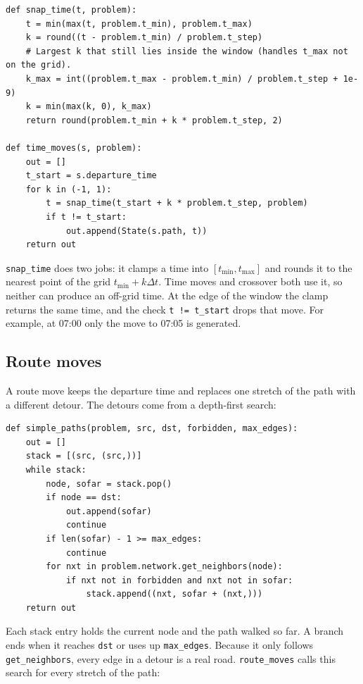 \documentclass[11pt,a4paper]{article}
\newcommand{\col}[1]{\texttt{#1}}
\begin{document}
\begin{lstlisting}
def snap_time(t, problem):
    t = min(max(t, problem.t_min), problem.t_max)
    k = round((t - problem.t_min) / problem.t_step)
    # Largest k that still lies inside the window (handles t_max not on the grid).
    k_max = int((problem.t_max - problem.t_min) / problem.t_step + 1e-9)
    k = min(max(k, 0), k_max)
    return round(problem.t_min + k * problem.t_step, 2)

def time_moves(s, problem):
    out = []
    t_start = s.departure_time
    for k in (-1, 1):
        t = snap_time(t_start + k * problem.t_step, problem)
        if t != t_start:
            out.append(State(s.path, t))
    return out
\end{lstlisting}

\noindent \col{snap\_time} does two jobs: it clamps a time into $[t_{\min}, t_{\max}]$ and rounds it
to the nearest point of the grid $t_{\min} + k\Delta t$. Time moves and crossover both use it, so
neither can produce an off-grid time. At the edge of the window the clamp returns the
same time, and the check \col{t != t\_start} drops that move. For example, at 07:00 only the
move to 07:05 is generated.

\subsection{Route moves}

A route move keeps the departure time and replaces one stretch of the path with a different detour.
The detours come from a depth-first search:

\begin{lstlisting}
def simple_paths(problem, src, dst, forbidden, max_edges):
    out = []
    stack = [(src, (src,))]
    while stack:
        node, sofar = stack.pop()
        if node == dst:
            out.append(sofar)
            continue
        if len(sofar) - 1 >= max_edges:
            continue
        for nxt in problem.network.get_neighbors(node):
            if nxt not in forbidden and nxt not in sofar:
                stack.append((nxt, sofar + (nxt,)))
    return out
\end{lstlisting}

\noindent Each stack entry holds the current node and the path walked so far. A branch ends when it
reaches \col{dst} or uses up \col{max\_edges}. Because it only follows \col{get\_neighbors}, every
edge in a detour is a real road. \col{route\_moves} calls this search for every stretch of the path:
\end{document}
